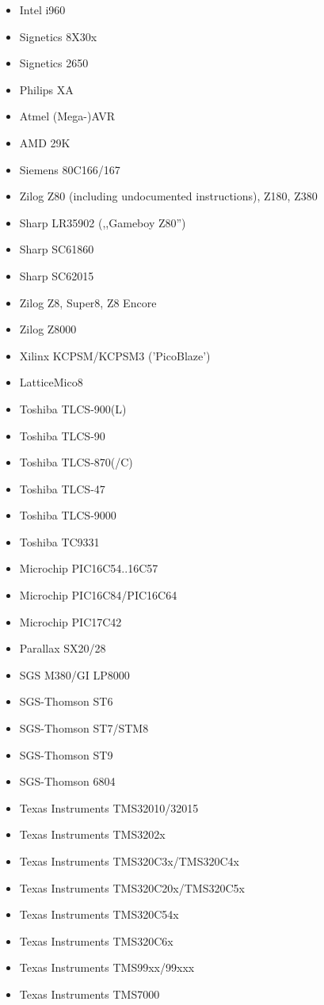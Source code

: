 \documentclass[12pt,twoside]{report}
\begin{document}
\begin{itemize}
\item{Intel i960}
\item{Signetics 8X30x}
\item{Signetics 2650}
\item{Philips XA}
\item{Atmel (Mega-)AVR}
\item{AMD 29K}
\item{Siemens 80C166/167}
\item{Zilog Z80 (including undocumented instructions), Z180, Z380}
\item{Sharp LR35902 (,,Gameboy Z80'')}
\item{Sharp SC61860}
\item{Sharp SC62015}
\item{Zilog Z8, Super8, Z8 Encore}
\item{Zilog Z8000}
\item{Xilinx KCPSM/KCPSM3 ('PicoBlaze')}
\item{LatticeMico8}
\item{Toshiba TLCS-900(L)}
\item{Toshiba TLCS-90}
\item{Toshiba TLCS-870(/C)}
\item{Toshiba TLCS-47}
\item{Toshiba TLCS-9000}
\item{Toshiba TC9331}
\item{Microchip PIC16C54..16C57}
\item{Microchip PIC16C84/PIC16C64}
\item{Microchip PIC17C42}
\item{Parallax SX20/28}
\item{SGS M380/GI LP8000}
\item{SGS-Thomson ST6}
\item{SGS-Thomson ST7/STM8}
\item{SGS-Thomson ST9}
\item{SGS-Thomson 6804}
\item{Texas Instruments TMS32010/32015}
\item{Texas Instruments TMS3202x}
\item{Texas Instruments TMS320C3x/TMS320C4x}
\item{Texas Instruments TMS320C20x/TMS320C5x}
\item{Texas Instruments TMS320C54x}
\item{Texas Instruments TMS320C6x}
\item{Texas Instruments TMS99xx/99xxx}
\item{Texas Instruments TMS7000}

\end{itemize}
\end{document}
